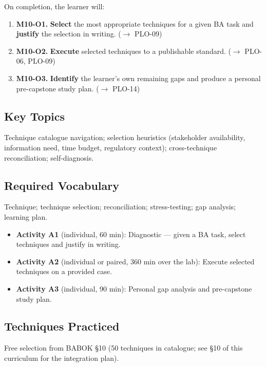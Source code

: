 \documentclass[11pt,letterpaper,oneside]{report}
\begin{document}
\begin{outcomes}
On completion, the learner will:
\begin{enumerate}
  \item \textbf{M10-O1.} \textbf{Select} the most appropriate techniques for a given BA task and \textbf{justify} the selection in writing. ($\to$ PLO-09)
  \item \textbf{M10-O2.} \textbf{Execute} selected techniques to a publishable standard. ($\to$ PLO-06, PLO-09)
  \item \textbf{M10-O3.} \textbf{Identify} the learner's own remaining gaps and produce a personal pre-capstone study plan. ($\to$ PLO-14)
\end{enumerate}
\end{outcomes}

\subsection*{Key Topics}
Technique catalogue navigation; selection heuristics (stakeholder availability, information need, time budget, regulatory context); cross-technique reconciliation; self-diagnosis.

\subsection*{Required Vocabulary}
Technique; technique selection; reconciliation; stress-testing; gap analysis; learning plan.

\begin{labbox}
\begin{itemize}
  \item \textbf{Activity A1} (individual, 60 min): Diagnostic --- given a BA task, select techniques and justify in writing.
  \item \textbf{Activity A2} (individual or paired, 360 min over the lab): Execute selected techniques on a provided case.
  \item \textbf{Activity A3} (individual, 90 min): Personal gap analysis and pre-capstone study plan.
\end{itemize}
\end{labbox}

\subsection*{Techniques Practiced}
Free selection from BABOK \S10 (50 techniques in catalogue; see \S10 of this curriculum for the integration plan).
\end{document}
